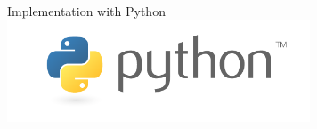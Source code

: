 \documentclass{beamer}
\begin{document}
%
\begin{frame}{Implementation with Python}
\centering
\includegraphics[width = 9cm]{Images/python-logo.png}
\end{frame}
\end{document}

